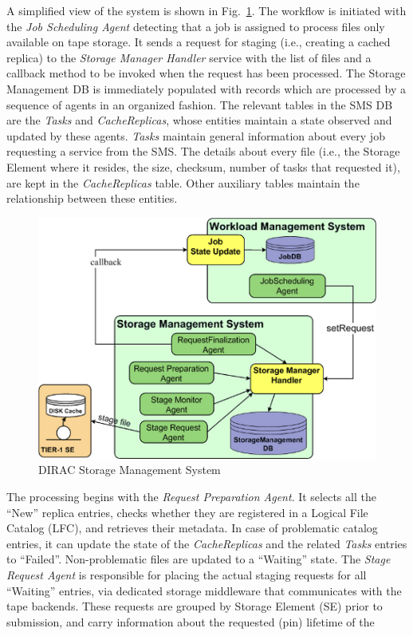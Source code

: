 \documentclass[sort&compress,preprint,3p]{elsarticle}
\begin{document}
A simplified view of the system is shown in  Fig.~\ref{fig:DIRAC-SMS}. The workflow is initiated
with the \textit{Job Scheduling Agent} detecting that a job is assigned to process files
only available on tape storage. It sends a request for staging (i.e., creating a
cached replica) to the \textit{Storage Manager Handler} service with the
list of files and a callback method to be invoked when the request has been
processed. The Storage Management DB is immediately populated with records which
are processed by a sequence of agents in an organized fashion. The relevant
tables in the SMS DB are the \textit{Tasks} and \textit{CacheReplicas}, whose
entities maintain a state observed and updated by these agents. \textit{Tasks} maintain
general information about every job requesting a service from the SMS. The
details about every file (i.e., the Storage Element where it resides, the
size, checksum, number of tasks that requested it), are kept in the \textit{CacheReplicas}
table. Other auxiliary tables maintain the relationship between these entities.
\begin{figure}[tp]
\begin{center}
 \includegraphics[width=0.5\linewidth,keepaspectratio=true]{./Figure4.png}
\end{center}
\caption{DIRAC Storage Management System}
\label{fig:DIRAC-SMS}
\end{figure}
The processing begins with the \textit{Request Preparation Agent}. It selects all the
``New'' replica entries, checks whether they are registered in a Logical
File Catalog (LFC), and retrieves their metadata. In case of problematic catalog
entries, it can update the state of the \textit{CacheReplicas} and the related \textit{Tasks}
entries to ``Failed''. Non-problematic files are updated to a
``Waiting'' state. The \textit{Stage Request Agent} is responsible for placing the actual staging
requests for all ``Waiting'' entries, via dedicated storage middleware that
communicates with the tape backends. These requests are grouped by Storage Element (SE) prior to
submission, and carry information about the requested (pin) lifetime of the
\end{document}
